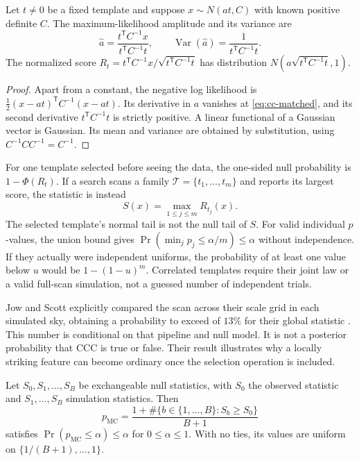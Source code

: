 \begin{theorem}
\label{thm:cc-matched}
Let $t\ne0$ be a fixed template and suppose $x\sim N(a t,C)$ with
known positive definite $C$. The maximum-likelihood amplitude and its
variance are
\begin{equation}
 \widehat a=\frac{t^{\mathsf T}C^{-1}x}{t^{\mathsf T}C^{-1}t},
 \qquad \operatorname{Var}(\widehat a)=\frac1{t^{\mathsf T}C^{-1}t}.
 \label{eq:cc-matched}
\end{equation}
The normalized score
$R_t=t^{\mathsf T}C^{-1}x/\sqrt{t^{\mathsf T}C^{-1}t}$
has distribution $N(a\sqrt{t^{\mathsf T}C^{-1}t},1)$.
\end{theorem}

\begin{proof}
Apart from a constant, the negative log likelihood is
$\frac12(x-at)^{\mathsf T}C^{-1}(x-at)$. Its derivative in $a$ vanishes
at \eqref{eq:cc-matched}, and its second derivative
$t^{\mathsf T}C^{-1}t$ is strictly positive. A linear functional of a
Gaussian vector is Gaussian. Its mean and variance are obtained by
substitution, using $C^{-1}CC^{-1}=C^{-1}$.
\end{proof}

For one template selected before seeing the data, the one-sided null
probability is $1-\Phi(R_t)$. If a search scans a family
$\mathcal T=\{t_1,\ldots,t_m\}$ and reports its largest score,
the statistic is instead
\begin{equation}
 S(x)=\max_{1\le j\le m}R_{t_j}(x).
 \label{eq:cc-scan}
\end{equation}
The selected template's normal tail is not the null tail of $S$.
For valid individual $p$-values, the union bound gives
$\Pr(\min_jp_j\le\alpha/m)\le\alpha$ without independence.
If they actually were independent uniforms, the probability of at least
one value below $u$ would be $1-(1-u)^m$. Correlated templates require
their joint law or a valid full-scan simulation, not a guessed number
of independent trials.

Jow and Scott explicitly compared the scan across their scale grid in
each simulated sky, obtaining a probability to exceed of $13\%$ for
their global statistic \citep[Sec.~3, pp.~6--7]{CCJowScott2020}. This
number is conditional on that pipeline and null model. It is not a
posterior probability that CCC is true or false. Their result illustrates
why a locally striking feature can become ordinary once the selection
operation is included.

\begin{theorem}
\label{thm:cc-rankp}
Let $S_0,S_1,\ldots,S_B$ be exchangeable null statistics, with $S_0$
the observed statistic and $S_1,\ldots,S_B$ simulation statistics.
Then
\begin{equation}
 p_{\mathrm{MC}}=
 \frac{1+\#\{b\in\{1,\ldots,B\}:S_b\ge S_0\}}{B+1}
 \label{eq:cc-rankp}
\end{equation}
satisfies $\Pr(p_{\mathrm{MC}}\le\alpha)\le\alpha$ for
$0\le\alpha\le1$. With no ties, its values are uniform on
$\{1/(B+1),\ldots,1\}$.
\end{theorem}

